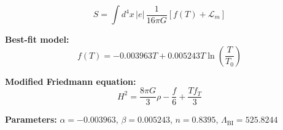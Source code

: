 
\begin{equation}
  S = \int d^4x \, |e| \, \frac{1}{16\pi G} \left[ f(T) + \mathcal{L}_m \right]
\end{equation}

\textbf{Best-fit model:}
\begin{equation}
  f(T) = -0.003963 T + 0.005243 T \ln\!\left(\frac{T}{T_0}\right)
\end{equation}

\textbf{Modified Friedmann equation:}
\begin{equation}
  H^2 = \frac{8\pi G}{3} \rho - \frac{f}{6} + \frac{T f_T}{3}
\end{equation}

\textbf{Parameters:}
$\alpha = -0.003963$, \quad
$\beta = 0.005243$, \quad
$n = 0.8395$, \quad
$\Lambda_{\text{BI}} = 525.8244$